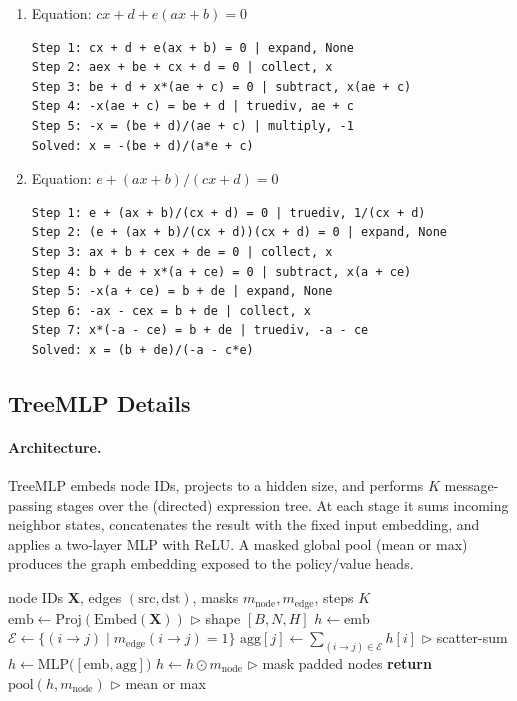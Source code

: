 \documentclass{article}
\theoremstyle{plain}
\theoremstyle{definition}
\theoremstyle{remark}
\begin{document}
\begin{enumerate}
\item Equation: $c x + d + e(a x + b) = 0$
\begin{verbatim}
Step 1: cx + d + e(ax + b) = 0 | expand, None
Step 2: aex + be + cx + d = 0 | collect, x
Step 3: be + d + x*(ae + c) = 0 | subtract, x(ae + c)
Step 4: -x(ae + c) = be + d | truediv, ae + c
Step 5: -x = (be + d)/(ae + c) | multiply, -1
Solved: x = -(be + d)/(a*e + c)
\end{verbatim}
\item Equation: $e + (a x + b)/(c x + d) = 0$
\begin{verbatim}
Step 1: e + (ax + b)/(cx + d) = 0 | truediv, 1/(cx + d)
Step 2: (e + (ax + b)/(cx + d))(cx + d) = 0 | expand, None
Step 3: ax + b + cex + de = 0 | collect, x
Step 4: b + de + x*(a + ce) = 0 | subtract, x(a + ce)
Step 5: -x(a + ce) = b + de | expand, None
Step 6: -ax - cex = b + de | collect, x
Step 7: x*(-a - ce) = b + de | truediv, -a - ce
Solved: x = (b + de)/(-a - c*e)
\end{verbatim}
\end{enumerate}


\subsection{TreeMLP Details}
\label{app:treemlp}

\paragraph{Architecture.}
TreeMLP embeds node IDs, projects to a hidden size, and performs $K$ message-passing stages over the (directed) expression tree.
At each stage it sums incoming neighbor states, concatenates the result with the fixed input embedding, and applies a two-layer MLP with ReLU.
A masked global pool (mean or max) produces the graph embedding exposed to the policy/value heads.

\begin{algorithm}[t]
\caption{TreeMLP message passing and pooling}
\label{alg:treemlp}
\begin{algorithmic}[1]
\REQUIRE node IDs $\mathbf{X}$, edges $(\text{src},\text{dst})$, masks $m_{\text{node}}, m_{\text{edge}}$, steps $K$
\STATE $\text{emb} \leftarrow \mathrm{Proj}(\mathrm{Embed}(\mathbf{X}))$ \hfill$\triangleright$ shape $[B,N,H]$
\STATE $h \leftarrow \text{emb}$
  \STATE $\mathcal{E} \leftarrow \{(i\!\to\!j) \mid m_{\text{edge}}(i\!\to\!j)=1\}$
  \STATE $\text{agg}[j] \leftarrow \sum_{(i\to j)\in \mathcal{E}} h[i]$ \hfill$\triangleright$ scatter-sum
  \STATE $h \leftarrow \mathrm{MLP}\big([\text{emb}, \text{agg}]\big)$
  \STATE $h \leftarrow h \odot m_{\text{node}}$ \hfill$\triangleright$ mask padded nodes
\ENDFOR
\STATE \textbf{return} $\mathrm{pool}(h, m_{\text{node}})$ \hfill$\triangleright$ mean or max
\end{algorithmic}
\end{algorithm}
\end{document}
